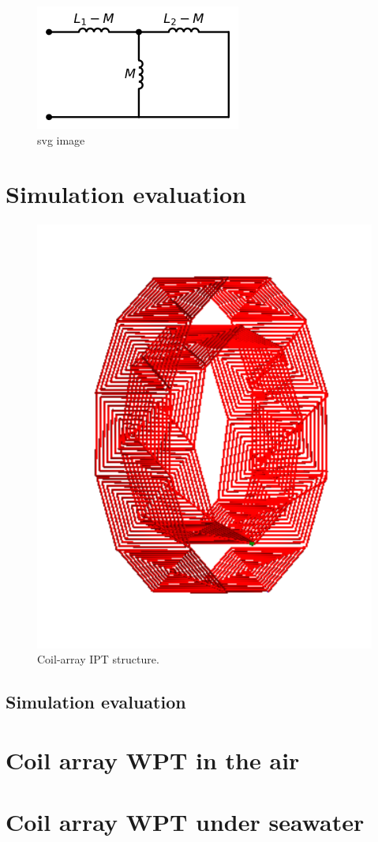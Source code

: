 \begin{figure}[htbp]
    \centering
    \includegraphics{images/3_mutual_inductance.png}
    \caption{svg image}
\end{figure}

\section{Simulation evaluation}

\begin{figure}[htbp]
    \centering
    \includegraphics[width=0.5\linewidth]{images/4_coil_array_system.png}
    \caption{Coil-array IPT structure.}
\end{figure}


\subsection{Simulation evaluation}
\section{Coil array WPT in the air}

\section{Coil array WPT under seawater}